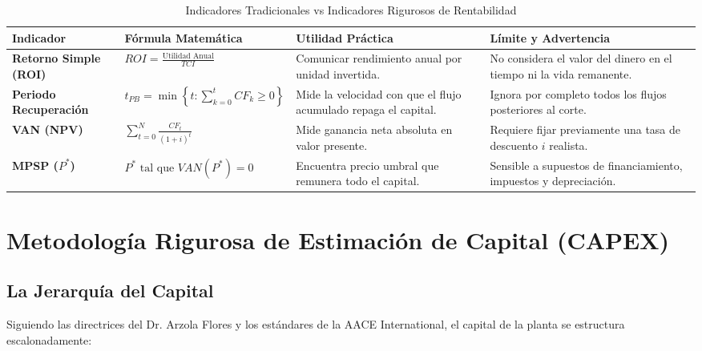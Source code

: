 \documentclass[11pt,letterpaper]{article}
\begin{document}
\begin{table}[htbp]
    \centering
    \small
    \caption{Indicadores Tradicionales vs Indicadores Rigurosos de Rentabilidad}
    \footnotesize
    \setlength{\tabcolsep}{4pt}
    \begin{tabularx}{\textwidth}{>{\raggedright\arraybackslash}p{2.8cm} >{\raggedright\arraybackslash}p{3.8cm} X X}
        \toprule
        \rowcolor{tableheader}
        \textbf{\color{white}Indicador} & \textbf{\color{white}Fórmula Matemática} & \textbf{\color{white}Utilidad Práctica} & \textbf{\color{white}Límite y Advertencia} \\
        \midrule
        \textbf{Retorno Simple (ROI)} & $\displaystyle ROI = \frac{\text{Utilidad Anual}}{TCI}$ & Comunicar rendimiento anual por unidad invertida. & No considera el valor del dinero en el tiempo ni la vida remanente. \\
        \rowcolor{tablerowgray}
        \textbf{Periodo Recuperación} & $\displaystyle t_{PB} = \min \left\{ t : \sum_{k=0}^t CF_k \ge 0 \right\}$ & Mide la velocidad con que el flujo acumulado repaga el capital. & Ignora por completo todos los flujos posteriores al corte. \\
        \textbf{VAN (NPV)} & $\displaystyle \sum_{t=0}^N \frac{CF_t}{(1+i)^t}$ & Mide ganancia neta absoluta en valor presente. & Requiere fijar previamente una tasa de descuento $i$ realista. \\
        \rowcolor{tablerowgray}
        \textbf{MPSP ($P^*$)} & $P^* \text{ tal que } VAN(P^*) = 0$ & Encuentra precio umbral que remunera todo el capital. & Sensible a supuestos de financiamiento, impuestos y depreciación. \\
        \bottomrule
    \end{tabularx}
\end{table}

\newpage

\section{Metodología Rigurosa de Estimación de Capital (CAPEX)}

\subsection{La Jerarquía del Capital}
Siguiendo las directrices del Dr. Arzola Flores y los estándares de la AACE International, el capital de la planta se estructura escalonadamente:
\end{document}
